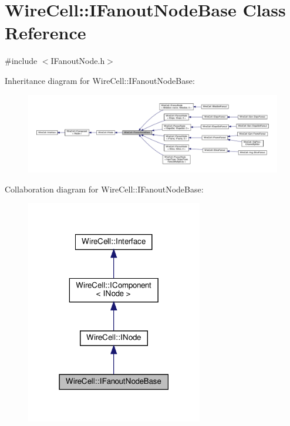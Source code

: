 \hypertarget{class_wire_cell_1_1_i_fanout_node_base}{}\section{Wire\+Cell\+:\+:I\+Fanout\+Node\+Base Class Reference}
\label{class_wire_cell_1_1_i_fanout_node_base}


{\ttfamily \#include $<$I\+Fanout\+Node.\+h$>$}



Inheritance diagram for Wire\+Cell\+:\+:I\+Fanout\+Node\+Base\+:
\nopagebreak
\begin{figure}[H]
\begin{center}
\leavevmode
\includegraphics[width=350pt]{class_wire_cell_1_1_i_fanout_node_base__inherit__graph}
\end{center}
\end{figure}


Collaboration diagram for Wire\+Cell\+:\+:I\+Fanout\+Node\+Base\+:
\nopagebreak
\begin{figure}[H]
\begin{center}
\leavevmode
\includegraphics[width=219pt]{class_wire_cell_1_1_i_fanout_node_base__coll__graph}
\end{center}
\end{figure}
